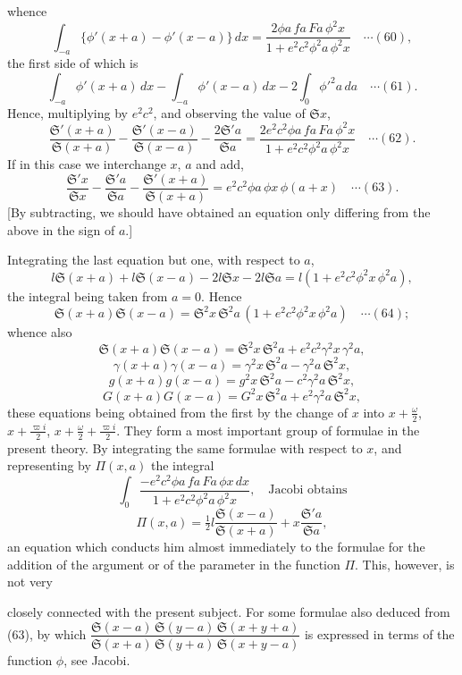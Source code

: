 \documentclass[12pt,a4paper]{article}
\providecommand{\fS}{\mathfrak{S}}
\begin{document}
whence
\[
\int_{-a}\{\phi'(x+a) - \phi'(x-a)\}\, dx = \frac{2\phi a\, fa\, Fa\, \phi^2 x}{1 + e^2 c^2 \phi^2 a\, \phi^2 x}\quad\cdots(60),
\]
the first side of which is
\[
\int_{-a}\phi'(x+a)\, dx - \int_{-a}\phi'(x-a)\, dx - 2\int_0\phi'^2 a\, da \quad\cdots(61).
\]
Hence, multiplying by $e^2 c^2$, and observing the value of $\fS x$,
\[
\frac{\fS'(x+a)}{\fS(x+a)} - \frac{\fS'(x-a)}{\fS(x-a)} - \frac{2\fS' a}{\fS a} = \frac{2 e^2 c^2 \phi a\, fa\, Fa\, \phi^2 x}{1 + e^2 c^2 \phi^2 a\, \phi^2 x}\quad\cdots(62).
\]
If in this case we interchange $x$, $a$ and add,
\[
\frac{\fS' x}{\fS x} - \frac{\fS' a}{\fS a} - \frac{\fS'(x+a)}{\fS(x+a)} = e^2 c^2 \phi a\, \phi x\, \phi(a+x)\quad\cdots(63).
\]
[By subtracting, we should have obtained an equation only differing from the above in the sign of $a$.]

Integrating the last equation but one, with respect to $a$,
\[
l\fS(x+a) + l\fS(x-a) - 2l\fS x - 2l\fS a = l(1 + e^2 c^2 \phi^2 x\, \phi^2 a),
\]
the integral being taken from $a = 0$. Hence
\[
\fS(x+a)\fS(x-a) = \fS^2 x\, \fS^2 a\, (1 + e^2 c^2 \phi^2 x\, \phi^2 a)\quad\cdots(64);
\]
whence also
\[
\fS(x+a)\fS(x-a) = \fS^2 x\, \fS^2 a + e^2 c^2 \gamma^2 x\, \gamma^2 a,
\]
\[
\gamma(x+a)\gamma(x-a) = \gamma^2 x\, \fS^2 a - \gamma^2 a\, \fS^2 x,
\]
\[
g(x+a)g(x-a) = g^2 x\, \fS^2 a - c^2 \gamma^2 a\, \fS^2 x,
\]
\[
G(x+a)G(x-a) = G^2 x\, \fS^2 a + e^2 \gamma^2 a\, \fS^2 x,
\]
these equations being obtained from the first by the change of $x$ into $x + \tfrac{\omega}{2}$, $x + \tfrac{\varpi i}{2}$, $x + \tfrac{\omega}{2} + \tfrac{\varpi i}{2}$. They form a most important group of formulae in the present theory. By integrating the same formulae with respect to $x$, and representing by $\Pi(x,a)$ the integral
\[
\int_0\frac{- e^2 c^2 \phi a\, fa\, Fa\, \phi x\, dx}{1 + e^2 c^2 \phi^2 a\, \phi^2 x},\quad\text{Jacobi obtains}
\]
\[
\Pi(x,a) = \tfrac{1}{2}l\frac{\fS(x-a)}{\fS(x+a)} + x\frac{\fS' a}{\fS a},
\]
an equation which conducts him almost immediately to the formulae for the addition of the argument or of the parameter in the function $\Pi$. This, however, is not very

\newpage
\setcounter{page}{154}

closely connected with the present subject. For some formulae also deduced from (63), by which $\dfrac{\fS(x-a)\,\fS(y-a)\,\fS(x+y+a)}{\fS(x+a)\,\fS(y+a)\,\fS(x+y-a)}$ is expressed in terms of the function $\phi$, see Jacobi.
\end{document}
